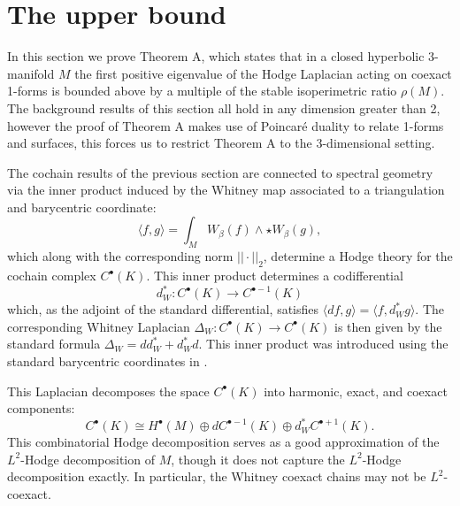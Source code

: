 
\section{The upper bound}
\label{sec:4}
In this section we prove Theorem A, which states that in a closed hyperbolic 3-manifold $M$ the first positive eigenvalue of the Hodge Laplacian acting on coexact 1-forms is bounded above by a multiple of the stable isoperimetric ratio $\rho(M)$. The background results of this section all hold in any dimension greater than 2, however the proof of Theorem A makes use of Poincar\'e duality to relate 1-forms and surfaces, this forces us to restrict Theorem A to the 3-dimensional setting.


The cochain results of the previous section are connected to spectral geometry via the inner product induced by the Whitney map associated to a triangulation and barycentric coordinate: $$\langle f, g\rangle = \int_M W_{\beta}(f)\wedge\star W_{\beta}(g),$$ which along with the corresponding norm $||\cdot||_2$, determine a Hodge theory for the cochain complex $C^{\bullet}(K)$. This inner product determines a codifferential $$d^*_W:C^{\bullet}(K)\to C^{\bullet-1}(K)$$ which, as the adjoint of the standard differential, satisfies $\langle d f, g\rangle = \langle f , d_W^* g \rangle.$
The corresponding Whitney Laplacian $\Delta_W:C^{\bullet}(K)\to C^{\bullet}(K)$ is then given by the standard formula $\Delta_W = dd_W^*+d_W^*d.$ This inner product was introduced using the standard barycentric coordinates in \cite{Dodziuk}.

This Laplacian decomposes the space $C^{\bullet}(K)$ into harmonic, exact, and coexact components: $$C^{\bullet}(K)\cong H^{\bullet}(M) \oplus dC^{\bullet-1}(K) \oplus d_W^* C^{\bullet+1}(K).$$ This combinatorial Hodge decomposition serves as a good approximation of the $L^2$-Hodge decomposition of $M$, though it does not capture the $L^2$-Hodge decomposition exactly. In particular, the Whitney coexact chains may not be $L^2$-coexact.


